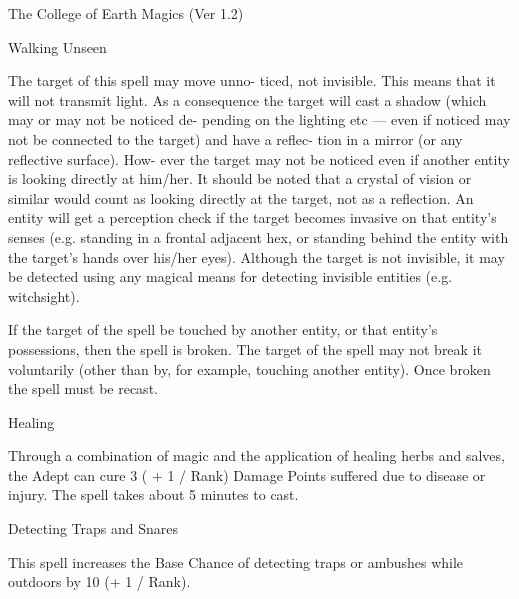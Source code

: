 \begin{Chapter}{The College of Earth Magics (Ver 1.2)}
\begin{spell}[G-5]{Walking Unseen }
\begin{effects}
 The  target  of  this  spell  may  move  unno-
ticed,  not  invisible.  This  means  that  it  will  not 
transmit light. As a consequence the target will cast 
a  shadow  (which  may  or  may  not  be  noticed  de-
pending on the lighting etc — even if noticed may 
not  be  connected  to  the  target)  and  have  a  reflec-
tion  in  a  mirror  (or  any  reflective  surface).  How-
ever  the  target  may  not be noticed  even  if  another 
entity  is  looking  directly  at  him/her.  It  should  be 
noted  that  a  crystal  of  vision  or  similar  would 
count  as  looking  directly  at  the  target,  not  as  a 
reflection.  An  entity  will  get  a  perception check if 
the target becomes invasive on that entity’s senses 
(e.g. standing in a frontal adjacent hex, or standing 
behind  the  entity  with  the  target’s  hands  over 
his/her eyes). Although the target is not invisible, it 
may  be  detected  using  any  magical  means  for 
detecting invisible entities (e.g. witchsight). 

If  the  target  of  the  spell  be  touched  by  another 
entity, or that entity’s possessions, then the spell is 
broken.  The  target  of  the  spell  may  not  break  it 
voluntarily  (other  than  by,  for  example,  touching 
another  entity).  Once  broken  the  spell  must  be 
recast. 

\end{effects}
\end{spell}

\begin{spell}[G-6]{Healing }

\begin{effects}
 Through  a  combination  of  magic  and  the 
application  of  healing  herbs  and  salves,  the  Adept 
can  cure  3  (  +  1  /  Rank)  Damage  Points  suffered 
due  to  disease  or  injury.  The  spell  takes  about  5 
minutes to cast. 

\end{effects}
\end{spell}

\begin{spell}[G-7]{Detecting Traps and Snares }

\begin{effects}
 This  spell  increases  the  Base  Chance  of 
detecting  traps  or  ambushes  while  outdoors  by  10 
(+ 1 / Rank). 


\end{effects}
\end{spell}
\end{Chapter}
